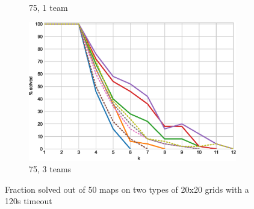 \documentclass[english,10pt]{article}
\begin{document}
\begin{figure}[t]
\begin{subfigure}{0.44\textwidth}
		\caption{75, 1 team}
		\label{fig:75-1-p}
	\end{subfigure}
	\begin{subfigure}{0.44\textwidth}
		\centering
		\includegraphics[width=\linewidth]{img/results/relative-comparison/75-3-p}
		\caption{75, 3 teams}
		\label{fig:75-3-p}
	\end{subfigure}
	\caption{Fraction solved out of 50 maps on two types of 20x20 grids with a 120s timeout}
	\label{fig:probs}
	\end{figure}
\end{document}
